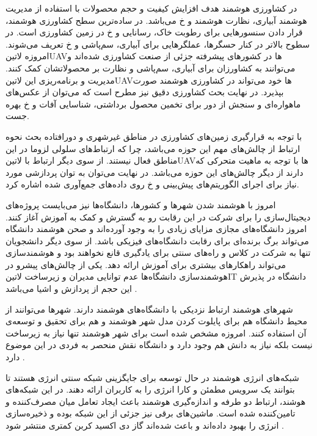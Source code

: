 

در کشاورزی هوشمند هدف افزایش کیفیت و حجم محصولات با استفاده از مدیریت هوشمند آبیاری، نظارت هوشمند و ‌خ می‌باشد.
در ساده‌ترین سطح کشاورزی هوشمند، قرار دادن سنسورهایی برای رطوبت خاک، رسانایی و ‌خ در زمین کشاورزی است. در سطوح بالاتر در کنار حسگرها، عملگرهایی برای آبیاری، سم‌پاشی و ‌خ تعریف می‌شوند.
امروزه ‌لاتین{UAV}ها در کشورهای پیشرفته جزئی از صنعت کشاورزی شده‌اند و می‌توانند به کشاورزان برای آبیاری، سم‌پاشی و نظارت بر محصولاتشان کمک کنند. مدیریت و برنامه‌ریزی این ‌لاتین{UAV}ها خود می‌تواند
در کشاورزی هوشمند صورت بپذیرد. در نهایت بحث کشاورزی دقیق نیز مطرح است که می‌توان از عکس‌های ماهواره‌ای و سنجش از دور برای تخمین محصول برداشتی، شناسایی آفات و ‌خ بهره جست.

با توجه به قرارگیری زمین‌های کشاورزی در مناطق غیرشهری و دورافتاده بحث نحوه ارتباط از چالش‌های مهم این حوزه می‌باشد، چرا که ارتباط‌های سلولی لزوما در این مناطق فعال نیستند.
از سوی دیگر ارتباط با ‌لاتین{UAV}ها با توجه به ماهیت متحرکی که دارند از دیگر چالش‌های این حوزه می‌باشد. در نهایت می‌توان به توان پردازشی مورد نیاز برای اجرای الگوریتم‌های پیش‌بینی
و ‌خ روی داده‌های جمع‌آوری شده اشاره کرد.


امروز با هوشمند شدن شهرها و کشورها، دانشگاه‌ها نیز می‌بایست پروژه‌های دیجیتال‌سازی را برای شرکت در این رقابت رو به گسترش و کمک به آموزش آغاز کنند.
امروز دانشگاه‌های مجازی مزایای زیادی را به وجود آورده‌اند و صحن هوشمند دانشگاه می‌تواند برگ برنده‌ای برای رقابت دانشگاه‌های فیزیکی باشد. از سوی دیگر دانشجویان تنها به شرکت در کلاس و راه‌های سنتی
برای یادگیری قانع نخواهند بود و هوشمندسازی می‌تواند راهکارهای بیشتری برای آموزش ارائه دهد.
یکی از چالش‌های پیشرو در هوشمندسازی دانشگاه‌ها عدم توانایی مدیران و زیرساخت ‌لاتین{IT} دانشگاه در پذیرش این حجم از پردازش و اشیا می‌باشد
.

شهرهای هوشمند ارتباط نزدیکی با دانشگاه‌های هوشمند دارند. شهرها می‌توانند از محیط دانشگاه هم برای پایلوت کردن مدل شهر هوشمند و هم برای تحقیق و توسعه‌ی آن استفاده کنند.
امروزه مشخص شده است برای شهر هوشمند تنها نیاز به زیرساخت نیست بلکه نیاز به دانش هم وجود دارد و دانشگاه نقش منحصر به فردی در این موضوع دارد
.


شبکه‌های انرژی هوشمند در حال توسعه برای جایگزینی شبکه سنتی انرژی هستند تا بتوانند یک سرویس مطمئن و کارا انرژی را به کاربران ارائه دهند.
در این شبکه‌های هوشند، ارتباط دو طرفه و اندازه‌گیری هوشمند باعث ایجاد تعامل میان مصرف‌کننده و تامین‌کننده شده است. ماشین‌های برقی
نیز جزئی از این شبکه بوده و ذخیره‌سازی انرژی را بهبود داده‌اند
و باعث شده‌اند گاز دی اکسید کربن کمتری منتشر شود
.

